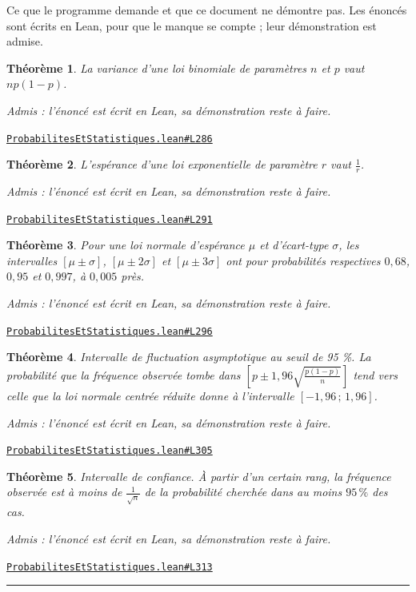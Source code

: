 \documentclass[11pt,a4paper]{article}
\theoremstyle{definition}
\theoremstyle{plain}
\newtheorem{theoreme}{Théorème}
\newcommand{\admis}{\par\smallskip\noindent\textit{Admis : l'énoncé est écrit en Lean, sa démonstration reste à faire.}\par}
\newcommand{\source}[2]{\par\smallskip\noindent\hfill{\footnotesize\href{#1}{\texttt{#2}}}\par\smallskip}
\begin{document}
\noindent
Ce que le programme demande et que ce document ne démontre pas. Les énoncés sont écrits en Lean, pour que le manque se compte ; leur démonstration est admise.

\begin{theoreme}
La variance d'une loi binomiale de paramètres $n$ et $p$ vaut $np(1 - p)$.
\end{theoreme}
\admis
\source{https://github.com/Commutator-IO/learn-lean/blob/main/courses/02-lycee/09-probabilites-et-statistiques/ProbabilitesEtStatistiques.lean\#L286}{ProbabilitesEtStatistiques.lean\#L286}

\begin{theoreme}
L'espérance d'une loi exponentielle de paramètre $r$ vaut $\tfrac1r$.
\end{theoreme}
\admis
\source{https://github.com/Commutator-IO/learn-lean/blob/main/courses/02-lycee/09-probabilites-et-statistiques/ProbabilitesEtStatistiques.lean\#L291}{ProbabilitesEtStatistiques.lean\#L291}

\begin{theoreme}
Pour une loi normale d'espérance $\mu$ et d'écart-type $\sigma$, les intervalles
$[\mu \pm \sigma]$, $[\mu \pm 2\sigma]$ et $[\mu \pm 3\sigma]$ ont pour probabilités
respectives $0{,}68$, $0{,}95$ et $0{,}997$, à $0{,}005$ près.
\end{theoreme}
\admis
\source{https://github.com/Commutator-IO/learn-lean/blob/main/courses/02-lycee/09-probabilites-et-statistiques/ProbabilitesEtStatistiques.lean\#L296}{ProbabilitesEtStatistiques.lean\#L296}

\begin{theoreme}
\emph{Intervalle de fluctuation asymptotique au seuil de 95 \%.} La probabilité que la
fréquence observée tombe dans $\left[p \pm 1{,}96\sqrt{\tfrac{p(1-p)}{n}}\right]$ tend vers
celle que la loi normale centrée réduite donne à l'intervalle $[-1{,}96\,;\,1{,}96]$.
\end{theoreme}
\admis
\source{https://github.com/Commutator-IO/learn-lean/blob/main/courses/02-lycee/09-probabilites-et-statistiques/ProbabilitesEtStatistiques.lean\#L305}{ProbabilitesEtStatistiques.lean\#L305}

\begin{theoreme}
\emph{Intervalle de confiance.} À partir d'un certain rang, la fréquence observée est à
moins de $\tfrac{1}{\sqrt n}$ de la probabilité cherchée dans au moins $95\,\%$ des cas.
\end{theoreme}
\admis
\source{https://github.com/Commutator-IO/learn-lean/blob/main/courses/02-lycee/09-probabilites-et-statistiques/ProbabilitesEtStatistiques.lean\#L313}{ProbabilitesEtStatistiques.lean\#L313}

\vfill
\noindent\rule{0.35\linewidth}{0.4pt}\par
{}
\end{document}
